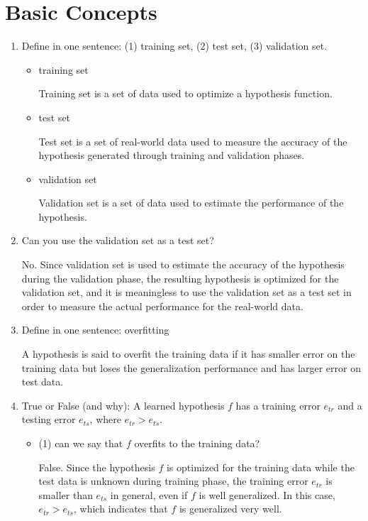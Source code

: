 \section{Basic Concepts}
\begin{enumerate}
\item Define in one sentence: (1) training set, (2) test set, (3) validation set.
\begin{itemize}
\item training set

Training set is a set of data used to optimize a hypothesis function.

\item test set

Test set is a set of real-world data used to measure the accuracy of the hypothesis generated through training and validation phases.

\item validation set

Validation set is a set of data used to estimate the performance of the hypothesis.

\end{itemize}

\item Can you use the validation set as a test set?

No. Since validation set is used to estimate the accuracy of the hypothesis during the validation phase, the resulting hypothesis is optimized for the validation set, and it is meaningless to use the validation set as a test set in order to measure the actual performance for the real-world data.

\item Define in one sentence: overfitting

A hypothesis is said to overfit the training data if it has smaller error on the training data but loses the generalization performance and has larger error on test data.

\item True or False (and why): A learned hypothesis $f$ has a training error $e_{tr}$ and a testing error $e_{ts}$, where $e_{tr} > e_{ts}$.

\begin{itemize}
\item (1) can we say that $f$ overfits to the training data?

False. Since the hypothesis $f$ is optimized for the training data while the test data is unknown during training phase, the training error $e_{tr}$ is smaller than $e_{ts}$ in general, even if $f$ is well generalized. In this case, $e_{tr} > e_{ts}$, which indicates that $f$ is generalized very well.


\end{itemize}
\end{enumerate}
